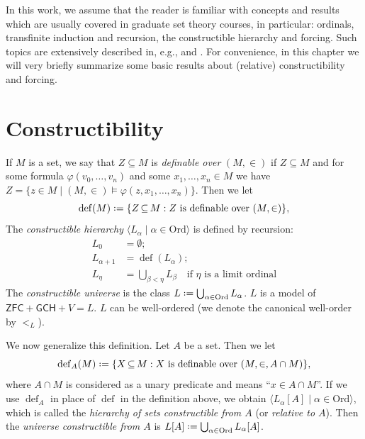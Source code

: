 \documentclass[11pt,a4paper]{report}
\theoremstyle{definition}
\theoremstyle{num.custom-title}
\theoremstyle{custom-title}
\DeclareMathOperator{\sse}{\subseteq}
\newcommand{\ZFC}{\ensuremath{\mathsf{ZFC}}\xspace}
\newcommand{\Ord}{\mathrm{Ord}}
\newcommand*{\defeq}{\mathrel{\rlap{%
                     \raisebox{0.3ex}{$\cdot$}}%
                     \raisebox{-0.3ex}{$\cdot$}}%
                     =}
\renewcommand{\phi}{\varphi}
\begin{document}
In this work, we assume that the reader is familiar with concepts and results which are usually covered in graduate set theory courses, in particular: ordinals, transfinite induction and recursion, the constructible hierarchy and forcing. Such topics are extensively described in, e.g., \cite{Jec2003} and \cite{Kun2013}. For convenience, in this chapter we will very briefly summarize some basic results about (relative) constructibility and forcing.

\section*{Constructibility}

If $M$ is a set, we say that $Z \sse M$ is \emph{definable over} $(M,\in)$ if $Z \sse M$ and for some formula $\phi(v_0,\ldots,v_n)$ and some $x_1,\ldots,x_n \in M$ we have $Z = \{z \in M \mid (M,\in) \models \phi(z,x_1,\ldots,x_n)\}$. Then we let 
\[
\operatorname{def} (M) \defeq \{ Z \sse M : Z \text{ is definable over } (M, \in) \},
\]
The \emph{constructible hierarchy} $\langle L_\alpha \mid \alpha \in \Ord \rangle$ is defined by recursion:
\begin{align*}
L_0 & = \emptyset;\\
L_{\alpha+1} & = \operatorname{def} (L_\alpha);\\
L_\eta & = \bigcup_{\beta < \eta} L_\beta \quad \text{if $\eta$ is a limit ordinal}
\end{align*}
%
The \emph{constructible universe} is the class $L \defeq \bigcup_{\alpha \in \Ord} L_\alpha$. $L$ is a model of $\ZFC + \mathsf{GCH} + V=L$. $L$ can be well-ordered (we denote the canonical well-order by $<_L$).

We now generalize this definition. Let $A$ be a set. Then we let
\[
\operatorname{def}_A (M) \defeq \{ X \sse M : X \text{ is definable over } (M, \in, A \cap M) \},
\]
where $A \cap M$ is considered as a unary predicate and means ``$x \in A \cap M$''. If we use $\operatorname{def}_A$ in place of $\operatorname{def}$ in the definition above, we obtain $\langle L_\alpha [A] \mid \alpha \in \Ord \rangle$, which is called the \emph{hierarchy of sets constructible from $A$} (or \emph{relative to $A$}). Then the \emph{universe constructible from $A$} is $L[A] \defeq \bigcup_{\alpha \in \Ord} L_\alpha [A]$.
\end{document}
